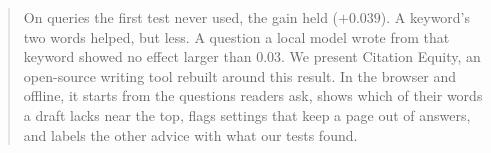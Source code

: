 \begin{abstract}
On queries the first test never used, the gain held ($+0.039$).
A keyword's two words helped, but less.
A question a local model wrote from that keyword showed no effect larger than 0.03.
We present Citation Equity, an open-source writing tool rebuilt around this result.
In the browser and offline, it starts from the questions readers ask, shows which of their words a draft lacks near the top, flags settings that keep a page out of answers, and labels the other advice with what our tests found.
\end{abstract}
